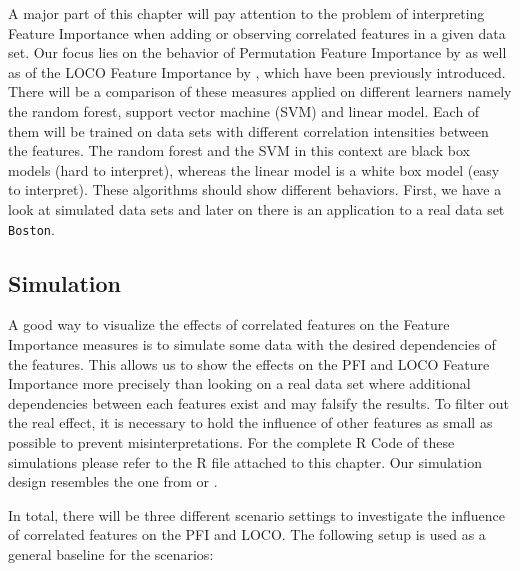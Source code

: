 \documentclass[
]{krantz}
\begin{document}
A major part of this chapter will pay attention to the problem of interpreting Feature Importance when adding or observing correlated features in a given data set. Our focus lies on the behavior of Permutation Feature Importance by \citet{breiman2001random} as well as of the LOCO Feature Importance by \citet{lei2018distribution}, which have been previously introduced. There will be a comparison of these measures applied on different learners namely the random forest, support vector machine (SVM) and linear model. Each of them will be trained on data sets with different correlation intensities between the features. The random forest and the SVM in this context are black box models (hard to interpret), whereas the linear model is a white box model (easy to interpret). These algorithms should show different behaviors. First, we have a look at simulated data sets and later on there is an application to a real data set \texttt{Boston}.

\hypertarget{simulation}{%
\subsection{Simulation}\label{simulation}}

A good way to visualize the effects of correlated features on the Feature Importance measures is to simulate some data with the desired dependencies of the features. This allows us to show the effects on the PFI and LOCO Feature Importance more precisely than looking on a real data set where additional dependencies between each features exist and may falsify the results. To filter out the real effect, it is necessary to hold the influence of other features as small as possible to prevent misinterpretations. For the complete R Code of these simulations please refer to the R file attached to this chapter. Our simulation design resembles the one from \citet{strobl2008} or \citet{archer2008}.

In total, there will be three different scenario settings to investigate the influence of correlated features on the PFI and LOCO. The following setup is used as a general baseline for the scenarios:
\end{document}
